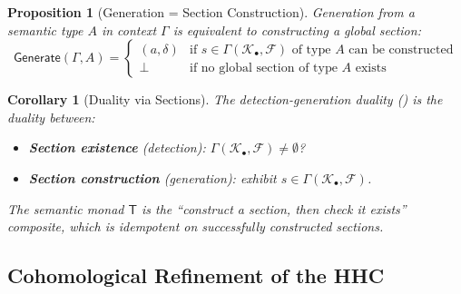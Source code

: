 \documentclass[11pt,a4paper]{article}
\theoremstyle{plain}
\newtheorem{proposition}[theorem]{Proposition}
\newtheorem{corollary}[theorem]{Corollary}
\theoremstyle{definition}
\theoremstyle{remark}
\newcommand{\Generate}{\mathsf{Generate}}
\newcommand{\SemanticT}{\mathsf{T}}
\begin{document}
\begin{proposition}[Generation = Section Construction]\label{prop:generate-section}
Generation from a semantic type $A$ in context $\Gamma$ is equivalent to constructing a global section:
\[
\Generate(\Gamma, A) = \begin{cases}
(a, \delta) & \text{if } s \in \Gamma(\mathcal{K}_\bullet, \mathcal{F}) \text{ of type } A \text{ can be constructed} \\
\bot & \text{if no global section of type } A \text{ exists}
\end{cases}
\]
\end{proposition}

\begin{corollary}[Duality via Sections]\label{cor:section-duality}
The detection-generation duality () is the duality between:
\begin{itemize}[nosep]
  \item \textbf{Section existence} (detection): $\Gamma(\mathcal{K}_\bullet, \mathcal{F}) \neq \emptyset$?
  \item \textbf{Section construction} (generation): exhibit $s \in \Gamma(\mathcal{K}_\bullet, \mathcal{F})$.
\end{itemize}
The semantic monad $\SemanticT$ is the ``construct a section, then check it exists'' composite, which is idempotent on successfully constructed sections.
\end{corollary}

\subsection{Cohomological Refinement of the HHC}
\end{document}
